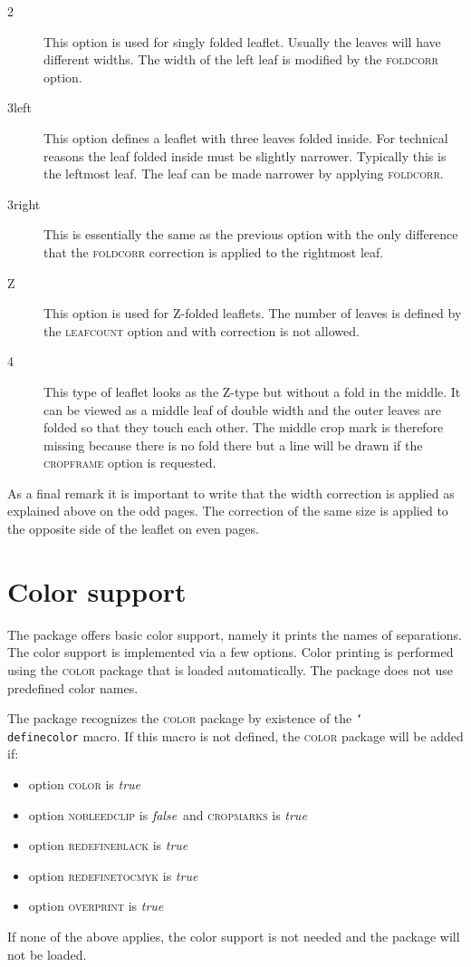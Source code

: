 \documentclass[11pt]{article}
\def\opt#1{\texorpdfstring{\textmd{\textsc{#1}}}{#1}}
\let\pkg\textsc
\DeclareRobustCommand\cmd[1]{\texttt{\char`\\#1}}
\def\true{\bool{true}}
\def\false{\bool{false}}
\def\bool#1{\texorpdfstring{\textit{#1}}{#1}}
\begin{document}
\begin{description}
\item[2] This option is used for singly folded leaflet. Usually the leaves will have different
widths. The width of the left leaf is modified by the \opt{foldcorr} option.
\item[3left] This option defines a leaflet with three leaves folded inside. For technical reasons
the leaf folded inside must be slightly narrower. Typically this is the leftmost leaf. The leaf can
be made narrower by applying \opt{foldcorr}.
\item[3right] This is essentially the same as the previous option with the only difference that the
\opt{foldcorr} correction is applied to the rightmost leaf.
\item[Z] This option is used for Z-folded leaflets. The number of leaves is defined by the
\opt{leafcount} option and with correction is not allowed.
\item[4] This type of leaflet looks as the Z-type but without a fold in the middle. It can be
viewed as a middle leaf of double width and the outer leaves are folded so that they touch each
other. The middle crop mark is therefore missing because there is no fold there but a line will be
drawn if the \opt{cropframe} option is requested.
\end{description}

As a final remark it is important to write that the width correction is applied as explained above
on the odd pages. The correction of the same size is applied to the opposite side of the leaflet on
even pages.

\section{Color support}\label{color}
The package offers basic color support, namely it prints the names of separations. The
color support is implemented via a few options. Color printing is performed using the \pkg{color}
package that is loaded automatically. The package does not use predefined color names.

The package recognizes the \pkg{color} package by existence of the \cmd{definecolor} macro. If this
macro is not defined, the \pkg{color} package will be added if:
\begin{itemize}
\item option \opt{color} is \true
\item option \opt{nobleedclip} is \false\ and \opt{cropmarks} is \true
\item option \opt{redefineblack} is \true
\item option \opt{redefinetocmyk} is \true
\item option \opt{overprint} is \true
\end{itemize}
If none of the above applies, the color support is not needed and the package will not be loaded.
\end{document}
